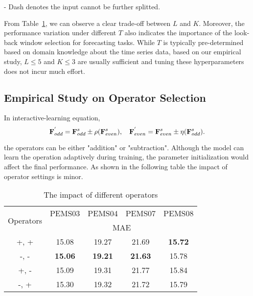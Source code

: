 \documentclass{article}
\begin{document}
\begin{table}[h]
\begin{threeparttable}
\begin{tabular}{c|c|c|c|c|c|c}
\end{tabular}
\begin{tablenotes} \tiny
		\item  - Dash denotes the input cannot be further splitted. 
\end{tablenotes} 

\end{threeparttable} \label{tab:LK}
\end{table}
   


From Table~\ref{tab:LK}, we can observe a clear trade-off between $L$ and $K$. Moreover, the performance variation under different $T$ also indicates the importance of the look-back window selection for forecasting tasks. While $T$ is typically pre-determined based on domain knowledge about the time series data, based on our empirical study, $ L\leq 5$ and $K \leq 3$ are usually sufficient and tuning these hyperparameters does not incur much effort.  


\subsection{Empirical Study on Operator Selection} \label{appendix:B3}
In interactive-learning equation,
\begin{equation}\label{eq:inter_2}
\small
    \mathbf{F}^{'}_{odd} = \mathbf{F}^{s}_{odd} \pm  \rho( \mathbf{F}^{s}_{even}),~~~
    \mathbf{F}^{'}_{even} = \mathbf{F}^{s}_{even} \pm   \eta(\mathbf{F}^{s}_{odd}).
\end{equation}\textbf{}

the operators can be either "addition" or "subtraction". Although the model can learn the operation adaptively during training, the parameter initialization would affect the final performance. As shown in the following table the impact of operator settings is minor.

\begin{table}[h]
\footnotesize
\caption{The impact of different operators}
\centering
\begin{tabular}{c|c|c|c|c}
\hline
\multirow{2}{*}{Operators} & PEMS03            & PEMS04            & PEMS07           & PEMS08           \\ \cline{2-5} 
                           & \multicolumn{4}{c}{MAE}                                          \\ \hline
+, +                       & 15.08 & 19.27 & 21.69 &  \textbf{15.72} \\ \hline
-, -                       & \textbf{15.06} &  \textbf{19.21} &  \textbf{21.63} & 15.78 \\ \hline
+, -                       & 15.09 & 19.31 & 21.77 & 15.84 \\ \hline
-, +                       & 15.30 & 19.32 & 21.72 & 15.79 \\ \hline
\end{tabular}
\label{tab:operator}
\end{table}
\end{document}
